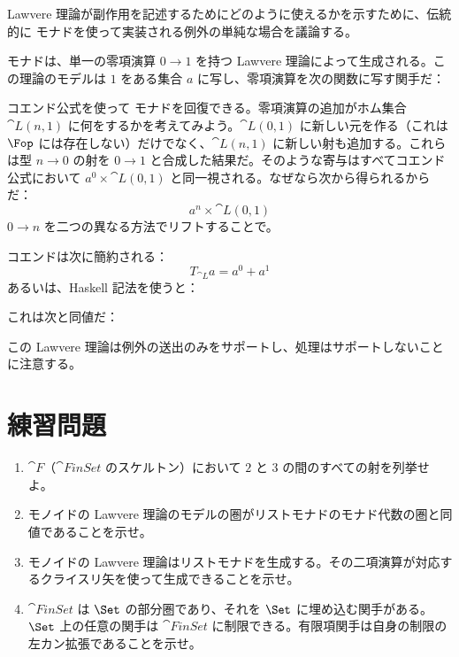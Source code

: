 Lawvere 理論が副作用を記述するためにどのように使えるかを示すために、伝統的に  モナドを使って実装される例外の単純な場合を議論する。

 モナドは、単一の零項演算 $0 \to 1$ を持つ Lawvere 理論によって生成される。この理論のモデルは $1$ をある集合 $a$ に写し、零項演算を次の関数に写す関手だ：

コエンド公式を使って  モナドを回復できる。零項演算の追加がホム集合 $\cat{L}(n, 1)$ に何をするかを考えてみよう。$\cat{L}(0, 1)$ に新しい元を作る（これは $\Fop$ には存在しない）だけでなく、$\cat{L}(n, 1)$ に新しい射も追加する。これらは型 $n \to 0$ の射を $0 \to 1$ と合成した結果だ。そのような寄与はすべてコエンド公式において $a^0 \times \cat{L}(0, 1)$ と同一視される。なぜなら次から得られるからだ：
\[a^n \times \cat{L}(0, 1)\]
$0 \to n$ を二つの異なる方法でリフトすることで。

\begin{figure}[H]
  \centering
\end{figure}

\noindent
コエンドは次に簡約される：
\[T_{\cat{L}} a = a^0 + a^1\]
あるいは、Haskell 記法を使うと：

これは次と同値だ：

この Lawvere 理論は例外の送出のみをサポートし、処理はサポートしないことに注意する。

\section{練習問題}

\begin{enumerate}
  \tightlist
  \item
        $\cat{F}$（$\cat{FinSet}$ のスケルトン）において $2$ と $3$ の間のすべての射を列挙せよ。
  \item
        モノイドの Lawvere 理論のモデルの圏がリストモナドのモナド代数の圏と同値であることを示せ。
  \item
        モノイドの Lawvere 理論はリストモナドを生成する。その二項演算が対応するクライスリ矢を使って生成できることを示せ。
  \item
        $\cat{FinSet}$ は $\Set$ の部分圏であり、それを $\Set$ に埋め込む関手がある。$\Set$ 上の任意の関手は $\cat{FinSet}$ に制限できる。有限項関手は自身の制限の左カン拡張であることを示せ。
\end{enumerate}

